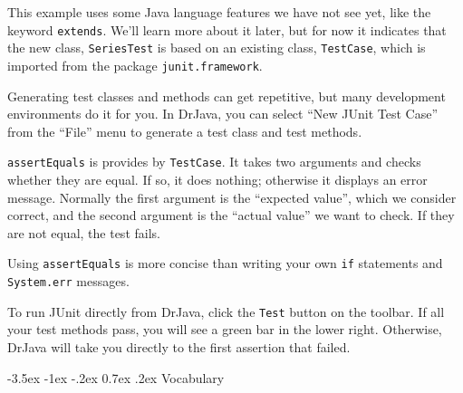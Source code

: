 \documentclass[12pt]{book}
\makeatletter
\theoremstyle{exercise}
\newcommand{\java}[1]{\verb"#1"}
\renewcommand{\section}{\@startsection{section}{1}{\z@}%
    {-3.5ex \@plus -1ex \@minus -.2ex}%
    {0.7ex \@plus.2ex}%
    {\normalfont\Large\bfseries}}
\newcommand{\java}[1]{\lstinline{#1}} %
\makeatother
\begin{document}
This example uses some Java language features we have not see yet, like the keyword \java{extends}.
We'll learn more about it later, but for now it indicates that the new class, \java{SeriesTest} is based on an existing class, \java{TestCase}, which is imported from the package \java{junit.framework}.

Generating test classes and methods can get repetitive, but many development environments do it for you.
In \mbox{DrJava}, you can select ``New JUnit Test Case'' from the ``File'' menu to generate a test class and test methods.

\java{assertEquals} is provides by \java{TestCase}.
It takes two arguments and checks whether they are equal.
If so, it does nothing; otherwise it displays an error message.
Normally the first argument is the ``expected value'', which we consider correct, and the second argument is the ``actual value'' we want to check.
If they are not equal, the test fails.

Using \java{assertEquals} is more concise than writing your own \java{if} statements and \java{System.err} messages.

To run JUnit directly from DrJava, click the {\tt Test} button on the toolbar.
If all your test methods pass, you will see a green bar in the lower right.
Otherwise, DrJava will take you directly to the first assertion that failed.


\section{Vocabulary}
\end{document}
